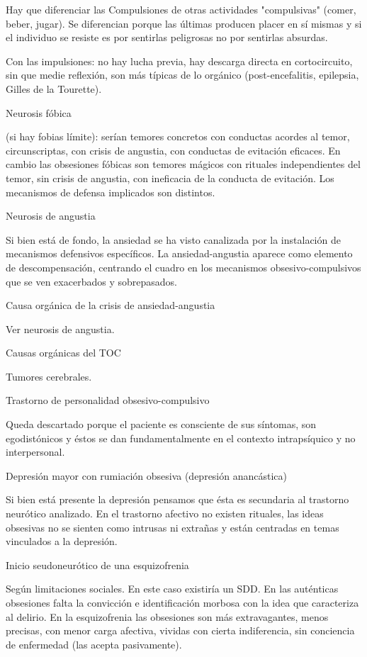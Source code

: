 \documentclass[encares.tex]{subfiles}
\begin{document}
Hay que diferenciar las Compulsiones de otras actividades "compulsivas" (comer, beber, jugar). Se diferencian porque las últimas producen placer en sí mismas y si el individuo se resiste es por sentirlas peligrosas no por sentirlas absurdas.

Con las impulsiones: no hay lucha previa, hay descarga directa en cortocircuito, sin que medie reflexión, son más típicas de lo orgánico (post-encefalitis, epilepsia, Gilles de la Tourette).

Neurosis fóbica

(si hay fobias límite): serían temores concretos con conductas acordes al temor, circunscriptas, con crisis de angustia, con conductas de evitación eficaces. En cambio las obsesiones fóbicas son temores mágicos con rituales independientes del temor, sin crisis de angustia, con ineficacia de la conducta de evitación. Los mecanismos de defensa implicados son distintos.

Neurosis de angustia

Si bien está de fondo, la ansiedad se ha visto canalizada por la instalación de mecanismos defensivos específicos. La ansiedad-angustia aparece como elemento de descompensación, centrando el cuadro en los mecanismos obsesivo-compulsivos que se ven exacerbados y sobrepasados.

Causa orgánica de la crisis de ansiedad-angustia

Ver neurosis de angustia.

Causas orgánicas del TOC

Tumores cerebrales.

Trastorno de personalidad obsesivo-compulsivo

Queda descartado porque el paciente es consciente de sus síntomas, son egodistónicos y éstos se dan fundamentalmente en el contexto intrapsíquico y no interpersonal.

Depresión mayor con rumiación obsesiva (depresión anancástica)

Si bien está presente la depresión pensamos que ésta es secundaria al trastorno neurótico analizado. En el trastorno afectivo no existen rituales, las ideas obsesivas no se sienten como intrusas ni extrañas y están centradas en temas vinculados a la depresión.

Inicio seudoneurótico de una esquizofrenia

Según limitaciones sociales. En este caso existiría un SDD. En las auténticas obsesiones falta la convicción e identificación morbosa con la idea que caracteriza al delirio. En la esquizofrenia las obsesiones son más extravagantes, menos precisas, con menor carga afectiva, vividas con cierta indiferencia, sin conciencia de enfermedad (las acepta pasivamente).
\end{document}
